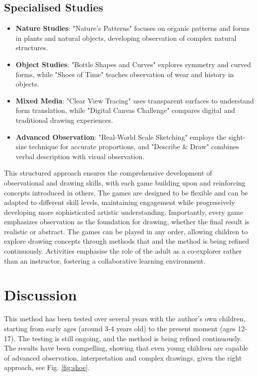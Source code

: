 \documentclass{article}
\begin{document}
\subsection{Specialised Studies}
\begin{itemize}
    \item \textbf{Nature Studies}: "Nature's Patterns" focuses on organic patterns and forms in plants and natural objects, developing observation of complex natural structures.
    \item \textbf{Object Studies}: "Bottle Shapes and Curves" explores symmetry and curved forms, while "Shoes of Time" teaches observation of wear and history in objects.
    \item \textbf{Mixed Media}: "Clear View Tracing" uses transparent surfaces to understand form translation, while "Digital Canvas Challenge" compares digital and traditional drawing experiences.
    \item \textbf{Advanced Observation}: "Real-World Scale Sketching" employs the sight-size technique for accurate proportions, and "Describe \& Draw" combines verbal description with visual observation.
\end{itemize}

This structured approach ensures the comprehensive development of observational and drawing skills, with each game building upon and reinforcing concepts introduced in others. The games are designed to be flexible and can be adapted to different skill levels, maintaining engagement while progressively developing more sophisticated artistic understanding. Importantly, every game emphasizes observation as the foundation for drawing, whether the final result is realistic or abstract. The games can be played in any order, allowing children to explore drawing concepts through methods that and the method is being refined continuously. Activities emphasise the role of the adult as a co-explorer rather than an instructor, fostering a collaborative learning environment.


\section{Discussion}

This method has been tested over several years with the author’s own children, starting from early ages (around 3-4 years old) to the present moment (ages 12-17). The testing is still ongoing, and the method is being refined continuously. The results have been compelling, showing that even young children are capable of advanced observation, interpretation and complex drawings, given the right approach, see Fig.  \ref{fig:shoe}.
\end{document}
